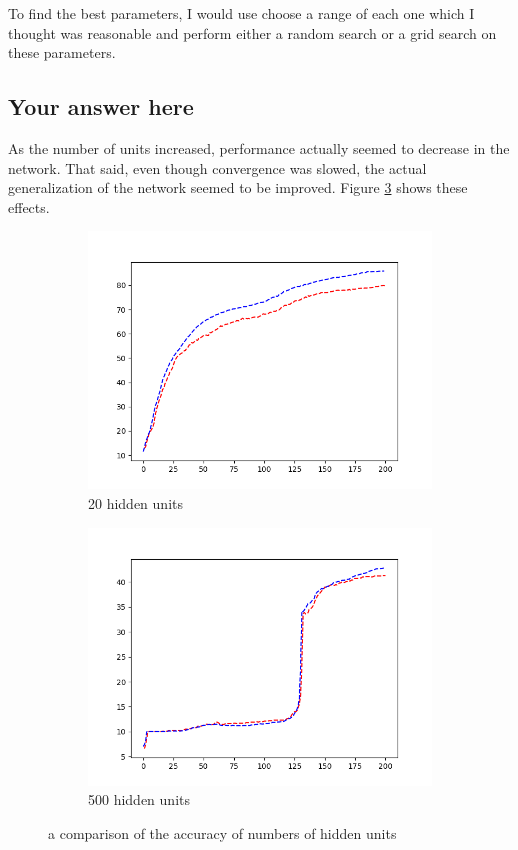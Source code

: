\documentclass{article}
\begin{document}
To find the best parameters, I would use choose a range of each one which I thought was reasonable and perform either a random search or a grid search on these parameters.

\subsection*{Your answer here}
As the number of units increased, performance actually seemed to decrease in the network. That said, even though convergence was slowed, the actual generalization of the network seemed to be improved. Figure \ref{fig:hu} shows these effects.

\begin{figure}[h]
\centering
\begin{subfigure}{.5\textwidth}
  \centering
  \includegraphics[width=.8\linewidth]{20huac.png}
  \caption{20 hidden units}
  \label{fig:sub1}
\end{subfigure}%
\begin{subfigure}{.5\textwidth}
  \centering
  \includegraphics[width=.8\linewidth]{500huac.png}
  \caption{500 hidden units}
  \label{fig:sub2}
\end{subfigure}
\caption{a comparison of the accuracy of numbers of hidden units}
\label{fig:hu}
\end{figure}
\end{document}
